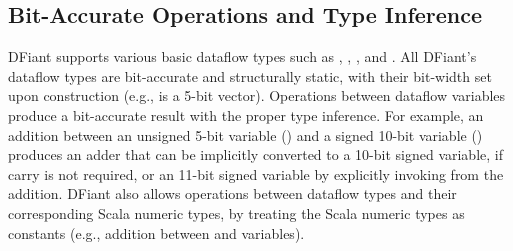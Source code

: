 
\subsection{Bit-Accurate Operations and Type Inference}
DFiant supports various basic dataflow types such as , , , and .
All DFiant's dataflow types are bit-accurate and structurally static, with their bit-width set upon construction (e.g.,  is a 5-bit vector). Operations between dataflow variables produce a bit-accurate result with the proper type inference. For example, an addition between an unsigned 5-bit variable () and a signed 10-bit variable () produces an adder that can be implicitly converted to a 10-bit signed variable, if carry is not required, or an 11-bit signed variable by explicitly invoking  from the addition. DFiant also allows operations between dataflow types and their corresponding Scala numeric types, by treating the Scala numeric types as constants (e.g., addition between  and  variables). 

